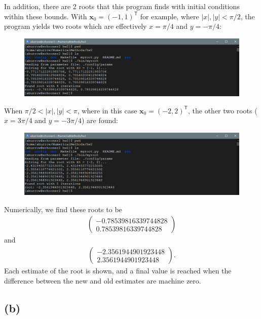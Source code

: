 \documentclass[12pt]{article}
\begin{document}
In addition, there are 2 roots that this program finds with initial conditions
within these bounds. With $\boldsymbol{x}_0 = (-1, 1)^\mathsf{T}$ for example,
where $|x|, |y| < \pi / 2$, the program yields two roots which are effectively
$x=\pi/4$ and $y=-\pi/4$:
\begin{figure}[H]
    \centering
    \includegraphics[width=1.0\textwidth]{root1}
    \label{fig:root1}
\end{figure}
When $\pi / 2 < |x|, |y| < \pi$, where in this case $\boldsymbol{x}_0 =
(-2, 2)^\mathsf{T}$, the other two roots ($x=3\pi/4$ and $y=-3\pi/4$) are
found:
\begin{figure}[H]
    \centering
    \includegraphics[width=1.0\textwidth]{root2}
    \label{fig:root2}
\end{figure}

Numerically, we find these roots to be
$$
\begin{aligned}
\begin{pmatrix}
-0.78539816339744828 \\ 0.78539816339744828
\end{pmatrix}
\end{aligned}
$$
and
$$
\begin{aligned}
\begin{pmatrix}
-2.3561944901923448 \\ 2.3561944901923448
\end{pmatrix}.
\end{aligned}
$$
Each estimate of the root is shown, and a final value is reached when the
difference between the new and old estimates are machine zero.

\subsection*{(b)}
\end{document}
